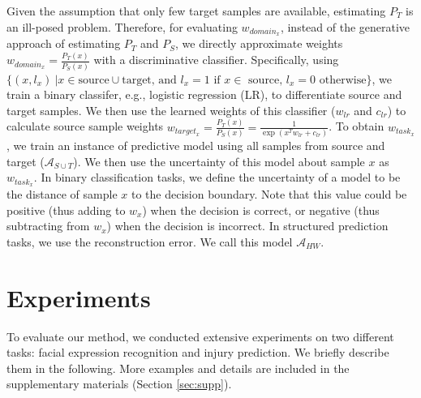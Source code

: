 \documentclass{article}
\begin{document}
\vspace{-.03cm}
Given the assumption that only few target samples are available,  estimating  $P_T$ is an ill-posed problem. Therefore, for evaluating $w_{domain_x}$, instead of the generative approach of estimating $P_T$ and $P_S$, we directly approximate weights \mbox{$w_{domain_x} = \frac{P_T(x)}{P_S(x)}$} with a discriminative classifier.  Specifically, using \mbox{$\{(x, l_x)\ | x \in \text{source} \cup \text{target, and $l_x=1$ if $x \in$ source,  $l_x=0$ otherwise} \}$}, we train a binary classifer, e.g., logistic regression (LR), to differentiate source and target samples. We then use the learned weights of this classifier ($w_{lr}$ and $c_{lr}$) to calculate source sample weights \mbox{$w_{target_x}=\frac{P_T(x)}{P_S(x)}=\frac{1}{\exp(x^T w_{lr} + c_{lr})}$}. To obtain $w_{task_x}$, we train an instance of predictive model using all samples from source and target \mbox{($\mathcal{A}_{S\cup T}$).} We then use the uncertainty of this model about sample $x$ as $w_{task_x}$. In binary classification tasks, we define the uncertainty of a model to be the distance of sample $x$ to the decision boundary. Note that this value could be positive (thus adding to $w_{x}$) when the decision is correct, or negative (thus subtracting from $w_{x}$) when the decision is incorrect. In structured prediction tasks, we  use the reconstruction error. We call this model $\mathcal{A}_{HW}$. 

\vspace{-.3cm}
\section{Experiments}
\vspace{-.3cm}
\label{sec:experiments}
To evaluate our method, we conducted extensive experiments on two different tasks: facial expression recognition and injury prediction. We briefly describe them in the following. More examples and details are included in the supplementary materials (Section \ref{sec:supp}). 
\vspace{-.3cm}
\end{document}
